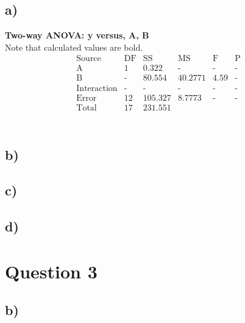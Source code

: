 \documentclass{article}
\begin{document}
\subsection*{a)}
\textbf{Two-way ANOVA: y versus, A, B} \\
Note that calculated values are bold.
\begin{equation*}
\begin{array}{c|c|c|c|c|c}
    \text{Source} &\text{DF}& \text{SS} & \text{MS} & \text{F} &\text{P}  \\
    \hline
    \text{A} & \text{1} & \text{0.322} & \textbf{-} & \textbf{-} &\textbf{-}  \\
    \text{B} & \textbf{-} & \text{80.554} & \text{40.2771} & \text{4.59} &\textbf{-}  \\
    \text{Interaction} & \textbf{-}  & \textbf{-} & \textbf{-} & \textbf{-} &\textbf{-}  \\
    \text{Error} & \text{12} & \text{105.327} & \text{8.7773} & \textbf{-} &\textbf{-}  \\
    \text{Total} & \text{17}  & \text{231.551} &  &  &  \\

\end{array}
\end{equation*}\\

\subsection*{b)}
\subsection*{c)}
\subsection*{d)}

\section*{Question 3}

\subsection*{b)}

\end{document}
